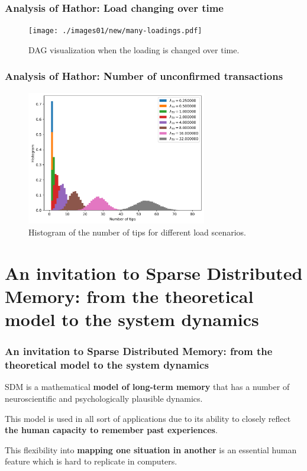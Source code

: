 \documentclass{beamer}
\begin{document}
\begin{frame}
\frametitle{Analysis of Hathor: Load changing over time}
\begin{figure}
\centering
\texttt{[image: ./images01/new/many-loadings.pdf]}
\caption{DAG visualization when the loading is changed over time.}
\end{figure}
\end{frame}


\begin{frame}
\frametitle{Analysis of Hathor: Number of unconfirmed transactions}
\begin{figure}
\includegraphics[width=0.7\textwidth]{./images01/new2/tips_aggregate.png}
\caption{Histogram of the number of tips for different load scenarios.}
\end{figure}
\end{frame}




\section{An invitation to Sparse Distributed Memory: from the theoretical model to the system dynamics}
\begin{frame}
\sectionpage
\end{frame}


\begin{frame}
\frametitle{An invitation to Sparse Distributed Memory: from the theoretical model to the system dynamics}

SDM is a mathematical \textbf{model of long-term memory} that has a number of neuroscientific and psychologically plausible dynamics.

This model is used in all sort of applications due to its ability to closely reflect \textbf{the human capacity to remember past experiences}.

This flexibility into \textbf{mapping one situation in another} is an essential human feature which is hard to replicate in computers.

\end{frame}
\end{document}
